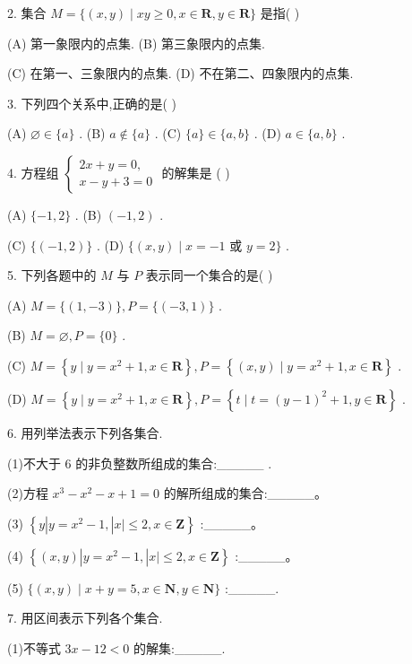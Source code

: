 \documentclass[10pt]{article}
\begin{document}
2. 集合 \(M = \{ \left( {x,y}\right)  \mid  {xy} \geq  0,x \in  \mathbf{R},y \in  \mathbf{R}\}\) 是指( )

(A) 第一象限内的点集. (B) 第三象限内的点集.

(C) 在第一、三象限内的点集. (D) 不在第二、四象限内的点集.

3. 下列四个关系中,正确的是( )

(A) \(\varnothing  \in  \{ a\}\) . (B) \(a \notin  \{ a\}\) . (C) \(\{ a\}  \in  \{ a,b\}\) . (D) \(a \in  \{ a,b\}\) .

4. 方程组 \(\left\{  \begin{array}{l} {2x} + y = 0, \\  x - y + 3 = 0 \end{array}\right.\) 的解集是 ( )

(A) \(\{  - 1,2\}\) . (B) \(\left( {-1,2}\right)\) .

(C) \(\{ \left( {-1,2}\right) \}\) . (D) \(\{ \left( {x,y}\right)  \mid  x =  - 1\) 或 \(y = 2\}\) .

5. 下列各题中的 \(M\) 与 \(P\) 表示同一个集合的是( )

(A) \(M = \{ \left( {1, - 3}\right) \} ,P = \{ \left( {-3,1}\right) \}\) .

(B) \(M = \varnothing ,P = \{ 0\}\) .

(C) \(M = \left\{  {y \mid  y = {x}^{2} + 1,x \in  \mathbf{R}}\right\}  ,P = \left\{  {\left( {x,y}\right)  \mid  y = {x}^{2} + 1,x \in  \mathbf{R}}\right\}\) .

(D) \(M = \left\{  {y \mid  y = {x}^{2} + 1,x \in  \mathbf{R}}\right\}  ,P = \left\{  {t \mid  t = {\left( y - 1\right) }^{2} + 1,y \in  \mathbf{R}}\right\}\) .

6. 用列举法表示下列各集合.

(1)不大于 6 的非负整数所组成的集合:\_\_\_\_\_ .

(2)方程 \({x}^{3} - {x}^{2} - x + 1 = 0\) 的解所组成的集合:\_\_\_\_\_。

(3) \(\left\{  {y\left| {y = {x}^{2} - 1,}\right| x \mid   \leq  2,x \in  \mathbf{Z}}\right\}\) :\_\_\_\_\_。

(4) \(\left\{  {\left( {x,y}\right) \left| {y = {x}^{2} - 1,}\right| x \mid   \leq  2,x \in  \mathbf{Z}}\right\}\) :\_\_\_\_\_。

(5) \(\{ \left( {x,y}\right)  \mid  x + y = 5,x \in  \mathbf{N},y \in  \mathbf{N}\}\) :\_\_\_\_\_.

7. 用区间表示下列各个集合.

(1)不等式 \({3x} - {12} < 0\) 的解集:\_\_\_\_\_.
\end{document}
